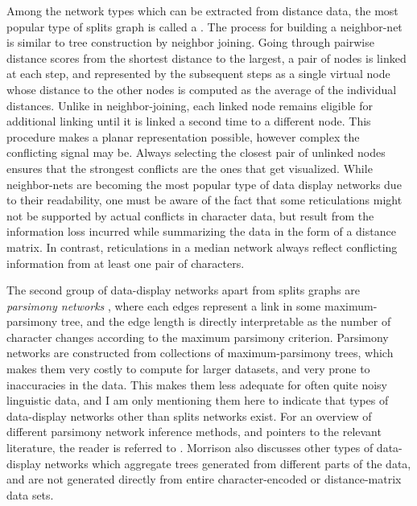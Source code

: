 Among the network types which can be extracted from distance data, the most popular type of splits graph is called a \textit{}. The process for building a neighbor-net is similar to tree construction by neighbor joining. Going through pairwise distance scores from the shortest distance to the largest, a pair of nodes is linked at each step, and represented by the subsequent steps as a single virtual node whose distance to the other nodes is computed as the average of the individual distances. Unlike in neighbor-joining, each linked node remains eligible for additional linking until it is linked a second time to a different node. This procedure makes a planar representation possible, however complex the conflicting signal may be. Always selecting the closest pair of unlinked nodes ensures that the strongest conflicts are the ones that get visualized. While neighbor-nets are becoming the most popular type of data display networks due to their readability, one must be aware of the fact that 
some reticulations might not be supported by actual conflicts in character data, but result from the information loss incurred while summarizing the data in the form of a distance matrix. In contrast, reticulations in a median network always reflect conflicting information from at least one pair of characters.

The second group of data-display networks apart from splits graphs are \textit{parsimony networks} , where each edges represent a link in some maximum-parsimony tree, and the edge length is directly interpretable as the number of character changes according to the maximum parsimony criterion. Parsimony networks are constructed from collections of maximum-parsimony trees, which makes them very costly to compute for larger datasets, and very prone to inaccuracies in the data. This makes them less adequate for often quite noisy linguistic data, and I am only mentioning them here to indicate that types of data-display networks other than splits networks exist. For an overview of different parsimony network inference methods, and pointers to the relevant literature, the reader is referred to \citet[Section 3.3.2]{morrison2011}. Morrison also discusses other types of data-display networks which aggregate trees generated from different parts of the data, and are not generated directly from entire character-encoded or distance-matrix data sets.

